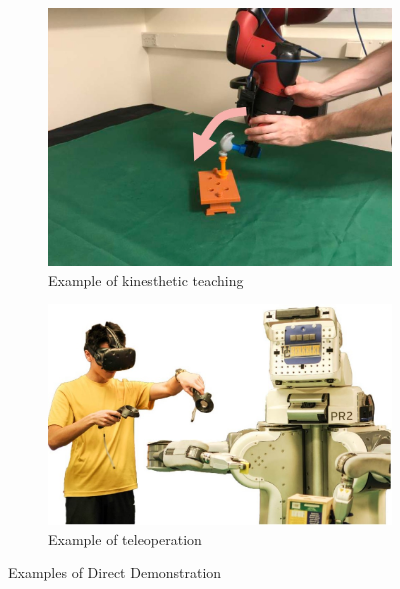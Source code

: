 \begin{figure}[htb]
     \centering
     \begin{subfigure}[b]{0.45\textwidth}
         \includegraphics[width=\textwidth]{Figures/images/direct_demonstration/kinesthetic.jpg}
         \caption{Example of kinesthetic teaching \cite{johns2021coarse_to_fine}}
         \label{fig:kinesthetic}
     \end{subfigure}
     \hfill
     \begin{subfigure}[b]{0.5\textwidth}
         \includegraphics[width=\textwidth]{Figures/images/direct_demonstration/teleoperation.jpg}
         \caption{Example of teleoperation \cite{zhang2018deep_vr_teleoperation}}
         \label{fig:teleoperation}
     \end{subfigure}
    \hfill
    \caption{Examples of Direct Demonstration}
    \label{fig:direct_demonstrations}
\end{figure}

